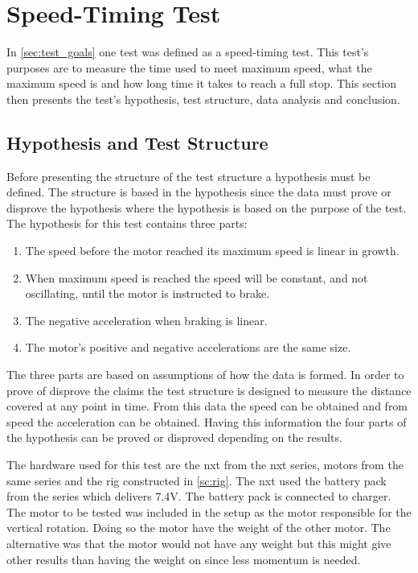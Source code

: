 \section{Speed-Timing Test}
In \cref{sec:test_goals} one test was defined as a speed-timing test. This test's purposes are to measure the time used to meet maximum speed, what the maximum speed is and how long time it takes to reach a full stop. This section then presents the test's hypothesis, test structure, data analysis and conclusion.

\subsection{Hypothesis and Test Structure}\label{subsec:acc_test_hyp}
Before presenting the structure of the test structure a hypothesis must be defined. The structure is based in the hypothesis since the data must prove or disprove the hypothesis where the hypothesis is based on the purpose of the test. The hypothesis for this test contains three parts:
\begin{enumerate}[label=\alph*)]
    \item The speed before the motor reached its maximum speed is linear in growth.
    \item When maximum speed is reached the speed will be constant, and not oscillating, until the motor is instructed to brake.
    \item The negative acceleration when braking is linear.
    \item The motor's positive and negative accelerations are the same size.
\end{enumerate}

The three parts are based on assumptions of how the data is formed. In order to prove of disprove the claims the test structure is designed to measure the distance covered at any point in time. From this data the speed can be obtained and from speed the acceleration can be obtained. Having this information the four parts of the hypothesis can be proved or disproved depending on the results.

The hardware used for this test are the \gls{nxt} from the \acrlong{nxt} series, motors from the same series and the rig constructed in \cref{sc:rig}. The \gls{nxt} used the battery pack from the series which delivers 7.4V. The battery pack is connected to charger. The motor to be tested was included in the setup as the motor responsible for the vertical rotation. Doing so the motor have the weight of the other motor. The alternative was that the motor would not have any weight but this might give other results than having the weight on since less momentum is needed.

